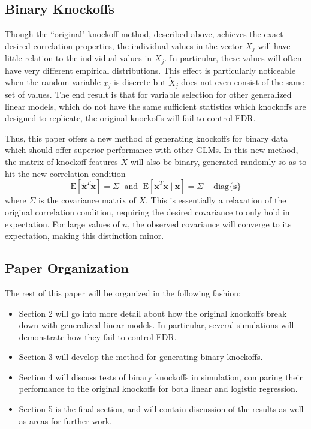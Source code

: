 \documentclass[11pt]{article}
\newcommand{\E}{\mathrm{E}}
\newcommand{\diag}[1]{\mathrm{diag}\{#1\}}
\newcommand{\st}{ \; \big | \:}
\theoremstyle{definition}
\begin{document}
\subsection{Binary Knockoffs}
    Though the ``original" knockoff method, described above, achieves the exact desired correlation properties, the individual values in the vector $X_j$ will have little relation to the individual values in $X_j$. In particular, these values will often have very different empirical distributions. This effect is particularly noticeable when the random variable $x_j$ is discrete but $\tilde X_j$ does not even consist of the same set of values. The end result is that for variable selection for other generalized linear models, which do not have the same sufficient statistics which knockoffs are designed to replicate, the original knockoffs will fail to control FDR. \par
    Thus, this paper offers a new method of generating knockoffs for binary data which should offer superior performance with other GLMs. In this new method, the matrix of knockoff features $\tilde X$ will also be binary, generated randomly so as to hit the new correlation condition
    \[ \E[\mathbf{\tilde x}^T\mathbf{\tilde x}]=\Sigma \; \textrm{ and } \; \E[\mathbf{\tilde x}^T \mathbf x \st \mathbf x] = \Sigma - \diag{\mathbf s}\]
    where $\Sigma$ is the covariance matrix of $X$. This is essentially a relaxation of the original correlation condition, requiring the desired covariance to only hold in expectation. For large values of $n$, the observed covariance will converge to its expectation, making this distinction minor.

\subsection{Paper Organization}
The rest of this paper will be organized in the following fashion:
\begin{itemize}
    \item Section 2 will go into more detail about how the original knockoffs break down with generalized linear models. In particular, several simulations will demonstrate how they fail to control FDR.
    \item Section 3 will develop the method for generating binary knockoffs.
    \item Section 4 will discuss tests of binary knockoffs in simulation, comparing their performance to the original knockoffs for both linear and logistic regression. 
    \item Section 5 is the final section, and will contain discussion of the results as well as areas for further work.
\end{itemize}
\end{document}
